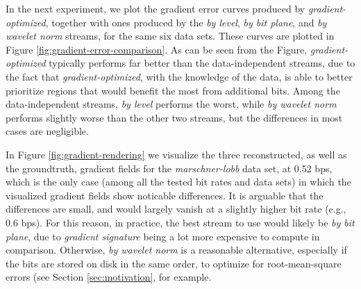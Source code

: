 In the next experiment, we plot the gradient error curves produced by \emph{gradient-optimized},
together with ones produced by the \emph{by level}, \emph{by bit plane}, and \emph{by wavelet norm}
streams, for the same six data sets. These curves are plotted in Figure
\ref{fig:gradient-error-comparison}. As can be seen from the Figure, \emph{gradient-optimized}
typically performs far better than the data-independent streams, due to the fact that
\emph{gradient-optimized}, with the knowledge of the data, is able to better prioritize regions that
would benefit the most from additional bits. Among the data-independent streams, \emph{by level}
performs the worst, while \emph{by wavelet norm} performs slightly worse than the other two streams,
but the differences in most cases are negligible.

In Figure \ref{fig:gradient-rendering} we visualize the three reconstructed, as well as the
groundtruth, gradient fields for the \emph{marschner-lobb} data set, at 0.52 bps, which is the only
case (among all the tested bit rates and data sets) in which the visualized gradient fields show
noticable differences. It is arguable that the differences are small, and would largely vanish at a
slightly higher bit rate (e.g., 0.6 bps). For this reason, in practice, the best stream to use would
likely be \emph{by bit plane}, due to \emph{gradient signature} being a lot more expensive to
compute in comparison. Otherwise, \emph{by wavelet norm} is a reasonable alternative, especially if
the bits are stored on disk in the same order, to optimize for root-mean-square errors (see Section
\ref{sec:motivation}, for example.

